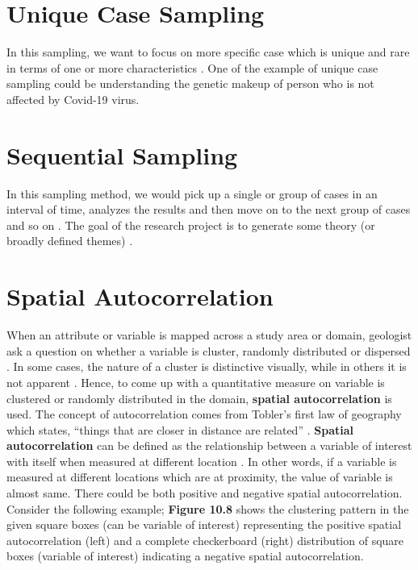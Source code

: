 \documentclass[
]{book}
\begin{document}
\hypertarget{unique-case-sampling}{%
\section{Unique Case Sampling}\label{unique-case-sampling}}

In this sampling, we want to focus on more specific case which is unique and rare in terms of one or more characteristics \citep{Teddlie2007}. One of the example of unique case sampling could be understanding the genetic makeup of person who is not affected by Covid-19 virus.

\hypertarget{sequential-sampling}{%
\section{Sequential Sampling}\label{sequential-sampling}}

In this sampling method, we would pick up a single or group of cases in an interval of time, analyzes the results and then move on to the next group of cases and so on \citep{Teddlie2007}. The goal of the research project is to generate some theory (or broadly defined themes) \citep{Teddlie2007}.

\hypertarget{spatial-autocorrelation-1}{%
\section{Spatial Autocorrelation}\label{spatial-autocorrelation-1}}

When an attribute or variable is mapped across a study area or domain, geologist ask a question on whether a variable is cluster, randomly distributed or dispersed \citep{Carr1993}. In some cases, the nature of a cluster is distinctive visually, while in others it is not apparent \citep{Carr1993}. Hence, to come up with a quantitative measure on variable is clustered or randomly distributed in the domain, \textbf{spatial autocorrelation} is used. The concept of autocorrelation comes from Tobler's first law of geography which states, ``things that are closer in distance are related'' \citep{Tobler1970}. \textbf{Spatial autocorrelation} can be defined as the relationship between a variable of interest with itself when measured at different location \citep{Getis1995CliffAA}. In other words, if a variable is measured at different locations which are at proximity, the value of variable is almost same. There could be both positive and negative spatial autocorrelation. Consider the following example; \textbf{Figure 10.8} shows the clustering pattern in the given square boxes (can be variable of interest) representing the positive spatial autocorrelation (left) and a complete checkerboard (right) distribution of square boxes (variable of interest) indicating a negative spatial autocorrelation.
\end{document}
